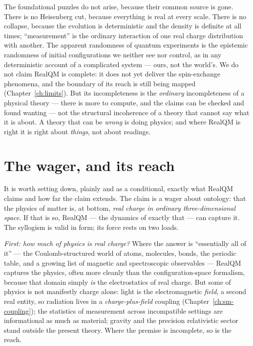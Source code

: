 The foundational puzzles do not arise, because their common source is gone. There is no Heisenberg cut, because
everything is real at every scale. There is no collapse, because the evolution is deterministic and the density
is definite at all times; ``measurement'' is the ordinary interaction of one real charge distribution with
another. The apparent randomness of quantum experiments is the epistemic randomness of initial configurations we
neither see nor control, as in any deterministic account of a complicated system --- ours, not the world's. We do
not claim RealQM is complete: it does not yet deliver the spin-exchange phenomena, and the boundary of its reach
is still being mapped (Chapter~\ref{ch:limits}). But its incompleteness is the \emph{ordinary} incompleteness of
a physical theory --- there is more to compute, and the claims can be checked and found wanting --- not the
structural incoherence of a theory that cannot say what it is about. A theory that can be \emph{wrong} is doing
physics; and where RealQM is right it is right about \emph{things}, not about readings.

\section{The wager, and its reach}\label{sec:wager}

It is worth setting down, plainly and as a conditional, exactly what RealQM claims and how far the claim extends.
The claim is a wager about ontology: that the physics of matter is, at bottom, \emph{real charge in ordinary
three-dimensional space}. If that is so, RealQM --- the dynamics of exactly that --- can capture it. The
syllogism is valid in form; its force rests on two loads.

\emph{First: how much of physics is real charge?} Where the answer is ``essentially all of it'' --- the
Coulomb-structured world of atoms, molecules, bonds, the periodic table, and a growing list of magnetic and
spectroscopic observables --- RealQM captures the physics, often more cleanly than the configuration-space
formalism, because that domain simply \emph{is} the electrostatics of real charge. But some of physics is not
manifestly charge alone: light is the electromagnetic \emph{field}, a second real entity, so radiation lives in a
\emph{charge-plus-field} coupling (Chapter~\ref{ch:sm-coupling}); the statistics of measurement across
incompatible settings are informational as much as material; gravity and the precision relativistic sector stand
outside the present theory. Where the premise is incomplete, so is the reach.

